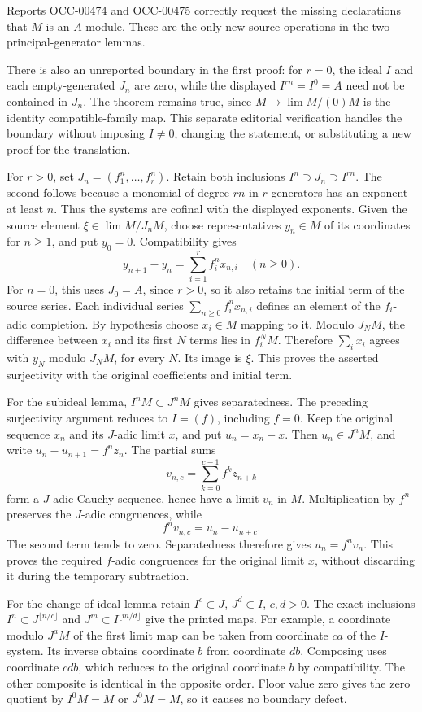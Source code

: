 Reports OCC-00474 and OCC-00475 correctly request the missing declarations that \(M\) is an \(A\)-module. These are the only new source operations in the two principal-generator lemmas.

There is also an unreported boundary in the first proof: for \(r=0\), the ideal \(I\) and each empty-generated \(J_n\) are zero, while the displayed \(I^{rn}=I^0=A\) need not be contained in \(J_n\). The theorem remains true, since \(M\to\lim M/(0)M\) is the identity compatible-family map. This separate editorial verification handles the boundary without imposing \(I\ne0\), changing the statement, or substituting a new proof for the translation.

For \(r>0\), set \(J_n=(f_1^n,\ldots,f_r^n)\). Retain both inclusions \(I^n\supset J_n\supset I^{rn}\). The second follows because a monomial of degree \(rn\) in \(r\) generators has an exponent at least \(n\). Thus the systems are cofinal with the displayed exponents. Given the source element \(\xi\in\lim M/J_nM\), choose representatives \(y_n\in M\) of its coordinates for \(n\geq1\), and put \(y_0=0\). Compatibility gives \[
y_{n+1}-y_n=\sum_{i=1}^r f_i^n x_{n,i}\quad(n\geq0).
\] For \(n=0\), this uses \(J_0=A\), since \(r>0\), so it also retains the initial term of the source series. Each individual series \(\sum_{n\geq0}f_i^nx_{n,i}\) defines an element of the \(f_i\)-adic completion. By hypothesis choose \(x_i\in M\) mapping to it. Modulo \(J_NM\), the difference between \(x_i\) and its first \(N\) terms lies in \(f_i^NM\). Therefore \(\sum_i x_i\) agrees with \(y_N\) modulo \(J_NM\), for every \(N\). Its image is \(\xi\). This proves the asserted surjectivity with the original coefficients and initial term.

For the subideal lemma, \(I^nM\subset J^nM\) gives separatedness. The preceding surjectivity argument reduces to \(I=(f)\), including \(f=0\). Keep the original sequence \(x_n\) and its \(J\)-adic limit \(x\), and put \(u_n=x_n-x\). Then \(u_n\in J^nM\), and write \(u_n-u_{n+1}=f^nz_n\). The partial sums \[
v_{n,c}=\sum_{k=0}^{c-1}f^kz_{n+k}
\] form a \(J\)-adic Cauchy sequence, hence have a limit \(v_n\) in \(M\). Multiplication by \(f^n\) preserves the \(J\)-adic congruences, while \[
f^nv_{n,c}=u_n-u_{n+c}.
\] The second term tends to zero. Separatedness therefore gives \(u_n=f^nv_n\). This proves the required \(f\)-adic congruences for the original limit \(x\), without discarding it during the temporary subtraction.

For the change-of-ideal lemma retain \(I^c\subset J\), \(J^d\subset I\), \(c,d>0\). The exact inclusions \(I^n\subset J^{\lfloor n/c\rfloor}\) and \(J^m\subset I^{\lfloor m/d\rfloor}\) give the printed maps. For example, a coordinate modulo \(J^aM\) of the first limit map can be taken from coordinate \(ca\) of the \(I\)-system. Its inverse obtains coordinate \(b\) from coordinate \(db\). Composing uses coordinate \(cdb\), which reduces to the original coordinate \(b\) by compatibility. The other composite is identical in the opposite order. Floor value zero gives the zero quotient by \(I^0M=M\) or \(J^0M=M\), so it causes no boundary defect.

